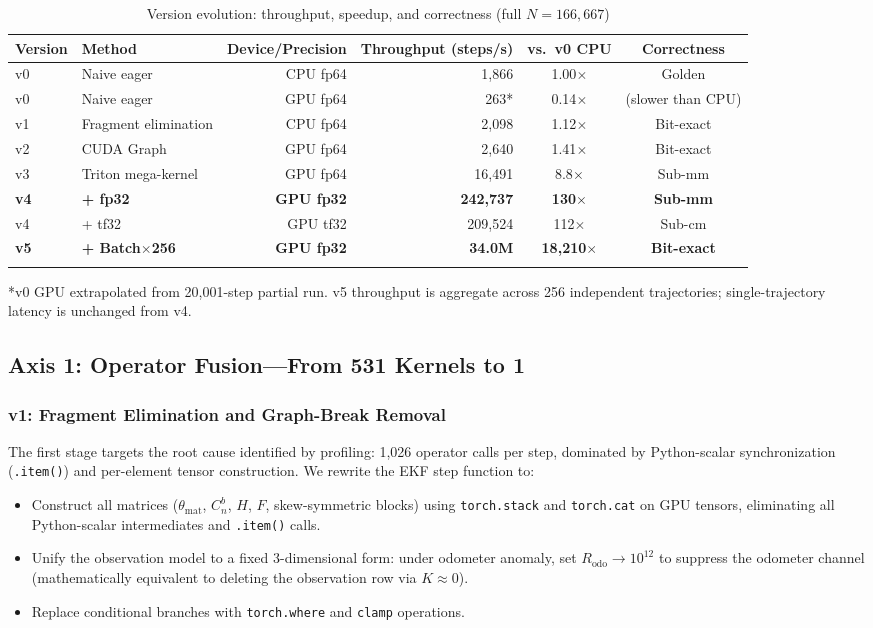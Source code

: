\documentclass[pdflatex,sn-mathphys-num]{sn-jnl}%
\theoremstyle{thmstyleone}%
\theoremstyle{thmstyletwo}%
\theoremstyle{thmstylethree}%
\begin{document}
\begin{table}[h]
\caption{Version evolution: throughput, speedup, and correctness (full $N=166{,}667$)}\label{tab:versions}
\begin{tabular}{@{}llrrcc@{}}
\toprule
Version & Method & Device/Precision & Throughput (steps/s) & vs.~v0 CPU & Correctness \\
\midrule
v0 & Naive eager & CPU fp64 & 1,866 & 1.00$\times$ & Golden \\
v0 & Naive eager & GPU fp64 & 263* & 0.14$\times$ & (slower than CPU) \\
v1 & Fragment elimination & CPU fp64 & 2,098 & 1.12$\times$ & Bit-exact \\
v2 & CUDA Graph & GPU fp64 & 2,640 & 1.41$\times$ & Bit-exact \\
v3 & Triton mega-kernel & GPU fp64 & 16,491 & 8.8$\times$ & Sub-mm \\
\textbf{v4} & \textbf{+ fp32} & \textbf{GPU fp32} & \textbf{242,737} & \textbf{130$\times$} & \textbf{Sub-mm} \\
v4 & + tf32 & GPU tf32 & 209,524 & 112$\times$ & Sub-cm \\
\textbf{v5} & \textbf{+ Batch$\times$256} & \textbf{GPU fp32} & \textbf{34.0M} & \textbf{18,210$\times$} & \textbf{Bit-exact} \\
\botrule
\end{tabular}

\smallskip
\footnotesize{*v0 GPU extrapolated from 20,001-step partial run. v5 throughput is aggregate across 256 independent trajectories; single-trajectory latency is unchanged from v4.}
\end{table}

\subsection{Axis 1: Operator Fusion---From 531 Kernels to 1}\label{subsec:fusion}

\subsubsection{v1: Fragment Elimination and Graph-Break Removal}

The first stage targets the root cause identified by profiling: 1,026 operator calls per step, dominated by Python-scalar synchronization (\texttt{.item()}) and per-element tensor construction. We rewrite the EKF step function to:

\begin{itemize}
\item Construct all matrices ($\theta_{\text{mat}}$, $C_n^b$, $H$, $F$, skew-symmetric blocks) using \texttt{torch.stack} and \texttt{torch.cat} on GPU tensors, eliminating all Python-scalar intermediates and \texttt{.item()} calls.
\item Unify the observation model to a fixed 3-dimensional form: under odometer anomaly, set $R_{\text{odo}} \rightarrow 10^{12}$ to suppress the odometer channel (mathematically equivalent to deleting the observation row via $K \approx 0$).
\item Replace conditional branches with \texttt{torch.where} and \texttt{clamp} operations.
\end{itemize}
\end{document}
